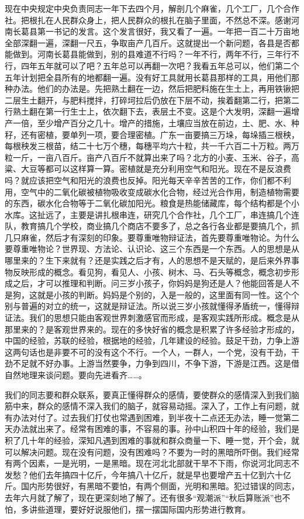现在中央规定中央负责同志一年下去四个月，解剖几个麻雀，几个工厂，几个合作社。把根扎在人民群众身上，把人民群众的根扎在脑子里面，不然总不深。感谢河南长葛县第一书记的发言。这个发言很好，我又看了一遍。一年把一百二十万亩地全部深翻一遍，深翻一尺五，争取亩产几百斤。这就提出一个新问题，各县是否都能做到。河南长葛县能做到，别的县难道不行吗？一年不行，两年不行，三年行不行，四年五年就可以了吧？五年总可以再翻一次吧？我看五年总可以，他们第二个五年计划把全县所有的地都翻一遍。没有好工具就用长葛县那样的工具，用他们那种办法。他们的办法是。先把熟土翻在一边，然后把肥料施在生土上，再用铁锹把二层生土翻开，与肥料搅拌，打碎坷拉后仍放在下层不动，挨着翻第二行，把第二行熟土翻在第一行生士上，依次翻下去，表层土不变。这是个大发明，深翻一遍增产一倍，至少增产百分之几十。增产的措施，土壤应当放在前边，土、肥、水、种秄，还有密植，要单列一项，要合理密植。广东一亩要搞三万垛，每垛插三根秧，每根秧发三根苗，结二十七万个穗，每穗平均六十粒，共一千六百二十万粒。两万粒一斤，一亩八百斤。亩产八百斤不就算出来了吗？北方的小麦、玉米、谷子，高粱、大豆等都可以这样算一算。密植就是充分利用空气和阳光。现在不是反浪费吗？就应该把空气和阳光的浪费也反掉。阳光每天辛辛苦苦的工作，你们都不利用，空气中的二氧化碳被植物吸收变成碳水化合物，经过光合作用，制造植物需要的东西，碳水化合物等于二氧化碳加阳光。粮食是热能储藏库，每个结构都是个小水库。这扯远了，主要是讲扎根串连，研究几个合作社，几个工厂，串连搞几个连队，教育搞几个学校，商业搞几个商店不要多了，总之各行各业都是要搞几个，抓几只麻雀，然后才有深刻的印象。要尊重唯物辩证法，首先要尊重唯物论。为什么要尊重唯物论？世界现、方法论、认识论、这三个东西是一个东西。人的思想是从哪里来的？生下来就有？还是实践之后才有，人的思想不是天赋的，是后来外界事物反映形成的概念。看见狗，看见人、小孩、树木、马、石头等概念，概念初步形成之后，才可以推理和判断。问三岁小孩子，你妈妈是狗还是人？他能回答是人不是狗，这就是小孩的判断。妈妈是个别的，入是一般的，这里面有同一性。这个个别与普遍的对立的统一，这就是辩证法。所以说三岁小孩就懂得矛盾统一，懂得辩证法。我们的思想只能由客观世界刺激感官而形成，是客观实践所形成。概念是从那里来的？是客观世界来的。现在的多快好省的概念是积累了许多经验才形成的，中国的经验，苏联的经验，根据地的经验，几年建设的经验。鼓足干劲，力争上游这两句话也是非要不可的没有这个不行。一个人，一群人，一个党，没有干劲，干劲不足就不好办事。上游当然要争，力争到四川，不争下游，下游是江西。这是借自然地理来谈问题。要向先进看齐……。

我们的同志要和群众联系，要真正懂得群众的感情，要使群众的感情深入到我们脑筋中来，群众的感情不深入我们的脑子，就容易动摇。深入了，工作上有问题，就有办法对付了。过去我们打仗也常遇到困难，到半夜十二点还无办法，睡一觉第二天办法就出来了。经常有困难的事，不容易的事。孙中山积四十年的经验，我们是积了几十年的经验，深知凡遇到困难的事就和群众商量一下、睡一觉，开个会，就可以解决问题。现在没有问题，没有困难吗？不要为一时的黑暗所吓倒。我们经常有两个因素，一是光明，一是黑暗。现在河北北部就干旱不下雨，你说河北同志不发愁？他们去年搞四十亿斤，今年搞八十亿斤，就是早也要增产五十亿到六十亿斤。国内形势很好，有黑暗不要怕，有两个侧面，光明和黑暗。犯过错误的同志，去年六月就了解了，现在更深刻地了解了。还有很多“观潮派”“秋后算账派”也不怕，多讲些道理，要好好说服他们，摆一摆国际国内形势进行教育。

